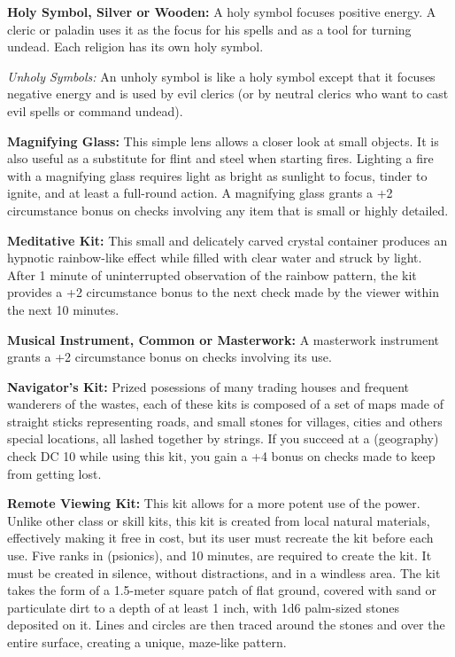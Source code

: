 \textbf{Holy Symbol, Silver or Wooden:} A holy symbol focuses positive energy. A cleric or paladin uses it as the focus for his spells and as a tool for turning undead. Each religion has its own holy symbol.

 \textit{Unholy Symbols:} An unholy symbol is like a holy symbol except that it focuses negative energy and is used by evil clerics (or by neutral clerics who want to cast evil spells or command undead).

\textbf{Magnifying Glass:} This simple lens allows a closer look at small objects. It is also useful as a substitute for flint and steel when starting fires. Lighting a fire with a magnifying glass requires light as bright as sunlight to focus, tinder to ignite, and at least a full-round action. A magnifying glass grants a +2 circumstance bonus on  checks involving any item that is small or highly detailed.

\textbf{Meditative Kit:} This small and delicately carved crystal container produces an hypnotic rainbow-like effect while filled with clear water and struck by light. After 1 minute of uninterrupted observation of the rainbow pattern, the kit provides a +2 circumstance bonus to the next  check made by the viewer within the next 10 minutes.

\textbf{Musical Instrument, Common or Masterwork:} A masterwork instrument grants a +2 circumstance bonus on  checks involving its use.

\textbf{Navigator's Kit:} Prized posessions of many trading houses and frequent wanderers of the wastes, each of these kits is composed of a set of maps made of straight sticks representing roads, and small stones for villages, cities and others special locations, all lashed together by strings. If you succeed at a  (geography) check DC 10 while using this kit, you gain a +4 bonus on  checks made to keep from getting lost.

\textbf{Remote Viewing Kit:} This kit allows for a more potent use of the  power. Unlike other class or skill kits, this kit is created from local natural materials, effectively making it free in cost, but its user must recreate the kit before each use. Five ranks in  (psionics), and 10 minutes, are required to create the kit. It must be created in silence, without distractions, and in a windless area. The kit takes the form of a 1.5-meter square patch of flat ground, covered with sand or particulate dirt to a depth of at least 1 inch, with 1d6 palm-sized stones deposited on it. Lines and circles are then traced around the stones and over the entire surface, creating a unique, maze-like pattern.


